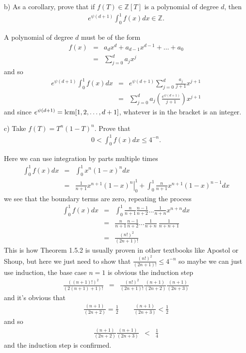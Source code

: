 \documentclass[aps,preprint,preprintnumbers,nofootinbib,showpacs,prd]{revtex4-1}
\newcommand{\nbea}{\begin{eqnarray*}}
\newcommand{\neea}{\end{eqnarray*}}
\begin{document}
b) As a corollary, prove that if $f(T) \in \mathbb{Z}[T]$ is a polynomial of degree $d$, then
%
\nbea
e^{\psi(d+1)}\int_0^1 f(x) dx \in \mathbb{Z}.
\neea
%

A polynomial of degree $d$ must be of the form
%
\nbea
f(x) & = & a_d x^d + a_{d-1} x^{d-1} + \dots + a_0 \\
& = & \sum_{j = 0}^d a_j x^j
\neea
%
and so
%
\nbea
e^{\psi(d+1)}\int_0^1 f(x) dx & = & e^{\psi(d+1)} \sum_{j=0}^d \frac{a_j}{j+1} x^{j+1} \\
& = & \sum_{j=0}^d a_j \left(\frac{e^{\psi(d+1)}}{j+1}\right) x^{j+1}
\neea
%
and since $e^{\psi(d+1)} = {\rm lcm}[1,2,\dots,d+1]$, whatever is in the bracket is an integer.

c) Take $f(T) = T^n (1 - T)^n$. Prove that
%
\nbea
0 < \int^1_0 f(x) dx \le 4^{-n}.
\neea
%

Here we can use integration by parts multiple times
%
\nbea
\int^1_0 f(x) dx & = & \int^1_0 x^n(1-x)^n dx \\ 
& = & \frac{1}{n+1} \left. x^{n+1}(1-x)^n \right |_0^1 + \int_0^1 \frac{n}{n+1} x^{n+1} (1-x)^{n-1} dx
\neea
%
we see that the boundary terms are zero, repeating the process
%
\nbea
\int^1_0 f(x) dx & = & \int_0^1 \frac{n}{n+1} \frac{n-1}{n+2} \dots \frac{1}{n + n} x^{n+n} dx \\
& = & \frac{n}{n+1} \frac{n-1}{n+2} \dots \frac{1}{n + n} ~ \frac{1}{n + n + 1} \\
& = & \frac{(n!)^2}{(2n + 1)!}
\neea
%
This is how Theorem 1.5.2 is usually proven in other textbooks like Apostol or Shoup, but here we just need to show that $ \frac{(n!)^2}{(2n + 1)!} \le 4^{-n}$ so maybe we can just use induction, the base case $n=1$ is obvious the induction step
%
\nbea
 \frac{((n+1)!)^2}{(2(n+1) + 1)!} & = &  \frac{(n!)^2}{(2n + 1)!}\frac{(n+1)}{(2n+2)}\frac{(n+1)}{(2n+3)}
\neea
%
and it's obvious that
%
\nbea
\frac{(n+1)}{(2n+2)} = \frac{1}{2} ~~~~~ ~~~~~ \frac{(n+1)}{(2n+3)} < \frac{1}{2}
\neea
%
and so
%
\nbea
\frac{(n+1)}{(2n+2)}\frac{(n+1)}{(2n+3)} & < & \frac{1}{4}
\neea
%
and the induction step is confirmed.
\end{document}
